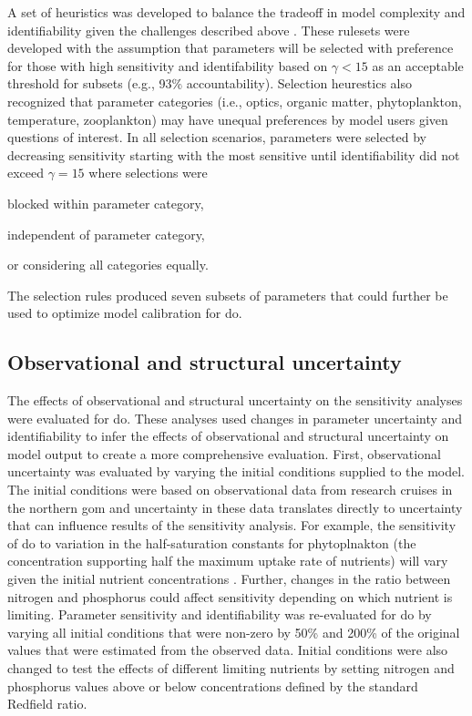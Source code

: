 \documentclass[letterpaper,12pt,oneside]{article}\usepackage[]{graphicx}\usepackage[]{color}
\begin{document}
A set of heuristics was developed to balance the tradeoff in model complexity and identifiability given the challenges described above \citep[see also][]{Wagener01}.  These rulesets were developed with the assumption that parameters will be selected with preference for those with high sensitivity and identifability based on $\gamma < 15$ as an acceptable threshold for subsets (e.g., 93\% accountability).  Selection heurestics also recognized that parameter categories (i.e., optics, organic matter, phytoplankton, temperature, zooplankton) may have unequal preferences by model users given questions of interest.  In all selection scenarios, parameters were selected by decreasing sensitivity starting with the most sensitive until identifiability did not exceed $\gamma = 15$ where selections were \begin{inparaenum}[1\upshape)]
\item blocked within parameter category,
\item independent of parameter category,
\item or considering all categories equally.
\end{inparaenum} The selection rules produced seven subsets of parameters that could further be used to optimize model calibration for \ac{do}.

\subsection{Observational and structural uncertainty}

The effects of observational and structural uncertainty on the sensitivity analyses were evaluated for \ac{do}.  These analyses used changes in parameter uncertainty and identifiability to infer the effects of observational and structural uncertainty on model output to create a more comprehensive evaluation.  First, observational uncertainty was evaluated by varying the initial conditions supplied to the model.  The initial conditions were based on observational data from research cruises in the northern \ac{gom} \citep{Murrell14} and uncertainty in these data translates directly to uncertainty that can influence results of the sensitivity analysis.  For example, the sensitivity of \ac{do} to variation in the half-saturation constants for phytoplnakton (the concentration supporting half the maximum uptake rate of nutrients) will vary given the initial nutrient concentrations \citep{Eppley69}.  Further, changes in the ratio between nitrogen and phosphorus could affect sensitivity depending on which nutrient is limiting.  Parameter sensitivity and identifiability was re-evaluated for \ac{do} by varying all initial conditions that were non-zero by 50\% and 200\% of the original values that were estimated from the observed data.  Initial conditions were also changed to test the effects of different limiting nutrients by setting nitrogen and phosphorus values above or below concentrations defined by the standard Redfield ratio.  
\end{document}
